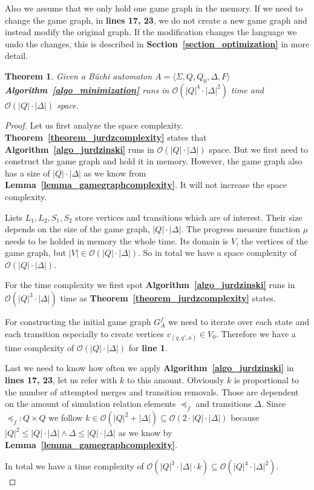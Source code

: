 \documentclass[12pt,oneside,bibliography=totoc,abstracton]{scrartcl}
\newcommand{\lemmaref}[1]{\textbf{Lemma~\ref{#1}}}
\newcommand{\theoremref}[1]{\textbf{Theorem~\ref{#1}}}
\newcommand{\sectionref}[1]{\textbf{Section~\ref{#1}}}
\newcommand{\algoref}[1]{\textbf{Algorithm~\ref{#1}}}
\newtheorem{mytheorem}{Theorem}
\begin{document}
Also we assume that we only hold one game graph in the memory. If we need to change the game graph,
in \textbf{lines 17, 23}, we do not create a new game graph and instead modify the original graph.
If the modification changes the language we undo the changes, this is described in
\sectionref{section_optimization} in more detail.
\begin{mytheorem}\label{theorem_minimizationcomplexity}
	Given a Büchi automaton $A = \langle \Sigma, Q, Q_0, \Delta, F\rangle$
	\algoref{algo_minimization} runs in $\mathcal{O}(|Q|^4 \cdot |\Delta|^2)$ time
	and $\mathcal{O}(|Q| \cdot |\Delta|)$ space.
\end{mytheorem}
\begin{proof}
	Let us first analyze the space complexity. \theoremref{theorem_jurdzcomplexity} states
	that \algoref{algo_jurdzinski} runs in $\mathcal{O}(|Q| \cdot |\Delta|)$ space.
	But we first need to construct the game graph and hold it in memory.
	However, the game graph also has a size of $|Q| \cdot |\Delta|$ as we know
	from \lemmaref{lemma_gamegraphcomplexity}. It will not increase the space complexity.
	
	Lists $L_1, L_2, S_1, S_2$ store vertices and transitions which are of interest.
	Their size depends on the size of the game graph, $|Q| \cdot |\Delta|$.
	The progress measure function $\mu$ needs to be holded in memory the whole time.
	Its domain is $V$, the vertices of the game graph, but $|V| \in \mathcal{O}(|Q| \cdot |\Delta|)$.
	So in total we have a space complexity of $\mathcal{O}(|Q| \cdot |\Delta|)$.

	For the time complexity we first spot \algoref{algo_jurdzinski} runs in
	$\mathcal{O}(|Q|^3 \cdot |\Delta|)$ time as \theoremref{theorem_jurdzcomplexity} states.
	
	For constructing the initial game graph $G^f_A$ we need to iterate over each state and each
	transition especially to create vertices $v_{(q, q', a)} \in V_0$. Therefore we have a time complexity
	of $\mathcal{O}(|Q| \cdot |\Delta|)$ for \textbf{line 1}.
	
	Last we need to know how often we apply \algoref{algo_jurdzinski} in \textbf{lines 17, 23},
	let us refer with $k$ to this amount. Obviously $k$ is proportional to the number of attempted
	merges and transition removals. Those are dependent on the amount of simulation
	relation elements $\preceq_f$ and transitions $\Delta$.
	Since $\preceq_f : Q \times Q$ we follow $k \in \mathcal{O}(|Q|^2 + |\Delta|) \subseteq
	\mathcal{O}(2 \cdot |Q| \cdot |\Delta|)$ because $|Q|^2 \le |Q| \cdot |\Delta| \land
	\Delta \le |Q| \cdot |\Delta|$ as we know by \lemmaref{lemma_gamegraphcomplexity}.
	
	In total we have a time complexity of $\mathcal{O}(|Q|^3 \cdot |\Delta| \cdot k) \subseteq
	\mathcal{O}(|Q|^4 \cdot |\Delta|^2)$.\\
\end{proof}
\end{document}
